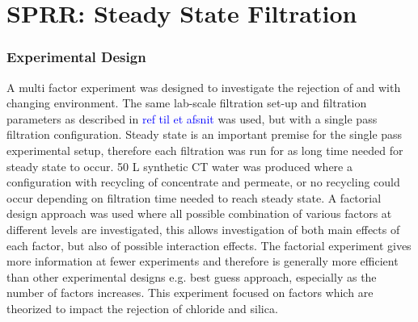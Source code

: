 \chapter{SPRR: Steady State Filtration }


\subsection{Experimental Design}
A multi factor experiment was designed to investigate the rejection of  and  with changing environment.
The same lab-scale filtration set-up and filtration parameters as described in \textcolor{blue}{ref til et afsnit} was used, but with a single pass filtration configuration.
Steady state is an important premise for the single pass experimental setup, therefore each filtration was run for as long time needed for steady state to occur. 
50 L synthetic CT water was produced where a configuration with recycling of concentrate and permeate, or no recycling could occur depending on filtration time needed to reach steady state. 
A factorial design approach was used where all possible combination of various factors at different levels are investigated, this allows investigation of both main effects of each factor, but also of possible interaction effects.  \citep{DesignOfExperiments_book_bruno}
The factorial experiment gives more information at fewer experiments and therefore is generally more efficient than other experimental designs e.g. best guess approach, especially as the number of factors increases. \citep{DesignOfExperiments_book_bruno} 
This experiment focused on factors which are theorized to impact the rejection of chloride and silica. 

